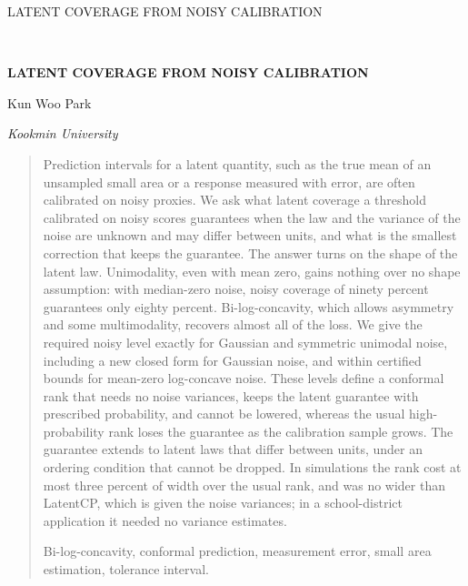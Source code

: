 \documentclass[12pt]{article}
\theoremstyle{definition}
\begin{document}
\renewcommand{\baselinestretch}{2}


{\hfill {\footnotesize\rm LATENT COVERAGE FROM NOISY CALIBRATION} \hfill}

\renewcommand{\thefootnote}{}
$\ $\par

\fontsize{12}{14pt plus.8pt minus .6pt}\selectfont \vspace{0.8pc}
\centerline{\large\bf LATENT COVERAGE FROM NOISY CALIBRATION}
\vspace{.4cm}
\centerline{Kun Woo Park}
\vspace{.4cm}
\centerline{\it Kookmin University}
\vspace{.55cm} \fontsize{9}{11.5pt plus.8pt minus.6pt}\selectfont

\begin{quotation}
Prediction intervals for a latent quantity, such as the true mean of an unsampled small area or a response measured with error, are often calibrated on noisy proxies. We ask what latent coverage a threshold calibrated on noisy scores guarantees when the law and the variance of the noise are unknown and may differ between units, and what is the smallest correction that keeps the guarantee. The answer turns on the shape of the latent law. Unimodality, even with mean zero, gains nothing over no shape assumption: with median-zero noise, noisy coverage of ninety percent guarantees only eighty percent. Bi-log-concavity, which allows asymmetry and some multimodality, recovers almost all of the loss. We give the required noisy level exactly for Gaussian and symmetric unimodal noise, including a new closed form for Gaussian noise, and within certified bounds for mean-zero log-concave noise. These levels define a conformal rank that needs no noise variances, keeps the latent guarantee with prescribed probability, and cannot be lowered, whereas the usual high-probability rank loses the guarantee as the calibration sample grows. The guarantee extends to latent laws that differ between units, under an ordering condition that cannot be dropped. In simulations the rank cost at most three percent of width over the usual rank, and was no wider than LatentCP, which is given the noise variances; in a school-district application it needed no variance estimates.

\vspace{9pt}
Bi-log-concavity, conformal prediction, measurement error, small area estimation, tolerance interval.
\par
\end{quotation}\par
\end{document}
